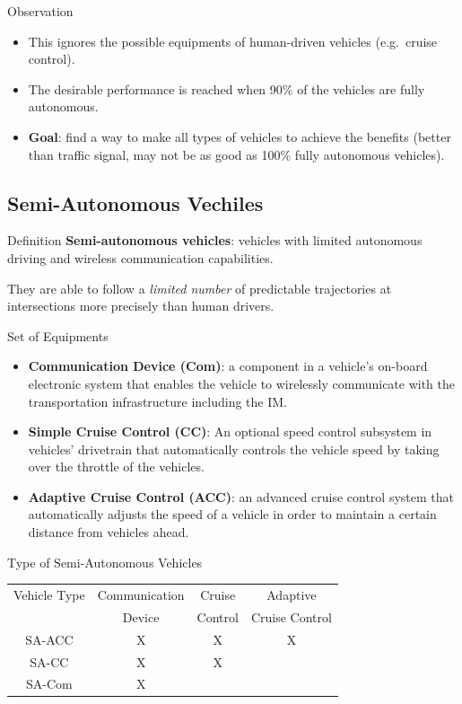 \documentclass{beamer}
\newcommand{\goal}{find a way to make all types of vehicles to
achieve the benefits (better than traffic signal, may not be as good
as 100\% fully autonomous vehicles)}
\begin{document}
\begin{frame}{Observation}
\begin{itemize}
\item This ignores the possible equipments of human-driven vehicles
(e.g.\ cruise control).
\item The desirable performance is reached when 90\% of the vehicles
are fully autonomous.\pause
\item \textbf{Goal}: \goal.
\end{itemize}
\end{frame}

\subsection{Semi-Autonomous Vechiles}

\begin{frame}{Definition}
\textbf{Semi-autonomous vehicles}: vehicles with limited autonomous
driving and wireless communication capabilities.\pause

\hfill

They are able to follow a \textit{limited number} of predictable
trajectories at intersections more precisely than human drivers.
\end{frame}

\begin{frame}{Set of Equipments}
\begin{itemize}
\item \textbf{Communication Device (Com)}:
a component in a vehicle's on-board electronic system that enables the
vehicle to wirelessly communicate with the transportation
infrastructure including the IM.\pause
\item \textbf{Simple Cruise Control (CC)}:
An optional speed control subsystem in vehicles' drivetrain that
automatically controls the vehicle speed by taking over the throttle
of the vehicles.\pause
\item \textbf{Adaptive Cruise Control (ACC)}:
an advanced cruise control system that automatically adjusts the speed
of a vehicle in order to maintain a certain distance from vehicles
ahead.
\end{itemize}
\end{frame}

\begin{frame}{Type of Semi-Autonomous Vehicles}
\begin{tabular}{|c|c|c|c|}
  \hline
  Vehicle Type & Communication & Cruise & Adaptive \\
               & Device & Control & Cruise Control \\
  \hline
  SA-ACC & X & X & X  \\
  \hline
  SA-CC & X & X &  \\
  \hline
  SA-Com & X & &  \\
  \hline
\end{tabular}
\end{frame}
\end{document}

